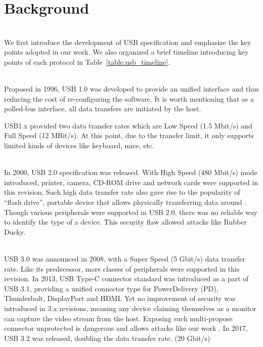 \section{Background}
\label{sec:background}
\noindent{}\\
We first introduce the development of USB specification and emphasize the key points adopted in our work. We also organized a brief timeline introducing key points of each protocol in Table~\ref{table:usb_timeline}.

\noindent{}\\
Proposed in 1996, USB 1.0\cite{usb10} was developed to provide an unified interface and thus reducing the cost of re-configuring the software. It is worth mentioning that as a polled-bus interface, all data transfers are initiated by the host.

USB1.x\cite{usb10}\cite{usb11} provided two data transfer rates which are Low Speed (1.5 Mbit/s) and Full Speed (12 MBit/s). At this point, due to the transfer limit, it only supports limited kinds of devices like keyboard, mice, etc.

\noindent{}\\
In 2000, USB 2.0\cite{usb20} specification was released. With High Speed (480 Mbit/s) mode introduced, printer, camera, CD-ROM drive and network cards were supported in this revision. Such high data transfer rate also gave rise to the popularity of ``flash drive'', portable device that allows physically transferring data around \cite{sok}. Though various peripherals were supported in USB 2.0, there was no reliable way to identify the type of a device. This security flaw allowed attacks like Rubber Ducky\cite{rubber}.

\noindent{}\\
USB 3.0\cite{usb30} was announced in 2008, with a Super Speed (5 Gbit/s) data transfer rate. Like its predecessor, more classes of peripherals were supported in this revision. In 2013, USB Type-C connector standard was introduced as a part of USB 3.1\cite{usb31}, providing a unified connector type for PowerDelivery (PD), Thunderbolt, DisplayPort and HDMI.  Yet no improvement of security was introduced in 3.x revisions, meaning any device claiming themselves as a monitor can capture the video stream from the host. Exposing such multi-propose connector unprotected is dangerous and allows attacks like our work \tool. In 2017, USB 3.2\cite{usb32} was released, doubling the data transfer rate. (20 Gbit/s)


